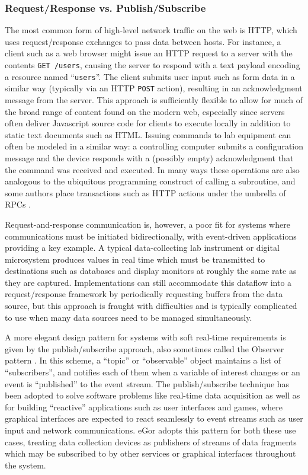 \documentclass[../thesis]{subfiles}
\begin{document}
\subsubsection{Request/Response vs. Publish/Subscribe}
The most common form of high-level network traffic on the web is HTTP,
which uses request/response exchanges to pass data between hosts. For
instance, a client such as a web browser might issue an HTTP request
to a server with the contents \texttt{GET /users}, causing the server
to respond with a text payload encoding a resource named
``\texttt{users}''. The client submits user input such as form data in
a similar way (typically via an HTTP \texttt{POST} action), resulting
in an acknowledgment message from the server. This approach is
sufficiently flexible to allow for much of the broad range of content
found on the modern web, especially since servers often deliver
Javascript source code for clients to execute locally in addition to
static text documents such as HTML. Issuing commands to lab equipment
can often be modeled in a similar way: a controlling computer submits
a configuration message and the device responds with a (possibly
empty) acknowledgment that the command was received and executed.  In
many ways these operations are also analogous to the ubiquitous
programming construct of calling a subroutine, and some authors place
transactions such as HTTP actions under the umbrella of \glspl{RPC}
\cite{DBLP:journals/corr/abs-0911-4395}.

Request-and-response communication is, however, a poor fit for systems
where communications must be initiated bidirectionally, with
event-driven applications providing a key example. A typical
data-collecting lab instrument or digital microsystem produces values
in real time which must be transmitted to destinations such as
databases and display monitors at roughly the same rate as they are
captured. Implementations can still accommodate this dataflow into a
request/response framework by periodically requesting buffers from the
data source, but this approach is fraught with difficulties and is
typically complicated to use when many data sources need to be managed
simultaneously.

A more elegant design pattern for systems with soft real-time
requirements is given by the publish/subscribe approach, also
sometimes called the Observer pattern \cite{GangOfFour}. In this
scheme, a ``topic'' or ``observable'' object maintains a list of
``subscribers'', and notifies each of them when a variable of interest
changes or an event is ``published'' to the event stream. The
publish/subscribe technique has been adopted to solve software
problems like real-time data acquisition as well as for building
``reactive'' applications such as user interfaces and games, where
graphical interfaces are expected to react seamlessly to event streams
such as user input and network communications. eGor adopts this
pattern for both these use cases, treating data collection devices as
publishers of streams of data fragments which may be subscribed to by
other services or graphical interfaces throughout the system.
\end{document}

